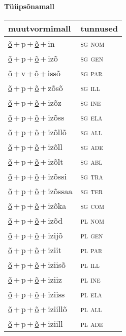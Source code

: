 
\vspace{1.8em}
\begin{minipage}{\textwidth}
\textbf{Tüüpsõnamall \,}\\

\begin{sideways}
\begin{tabular}{l l}
muutvormimall & tunnused \\
\hline
\underline{õ}\,+\,p\,+\,\underline{õ}\,+\,in & \textsc{ sg nom } \\
\underline{õ}\,+\,p\,+\,\underline{õ}\,+\,izõ & \textsc{ sg gen } \\
\underline{õ}\,+\,v\,+\,\underline{õ}\,+\,issõ & \textsc{ sg par } \\
\underline{õ}\,+\,p\,+\,\underline{õ}\,+\,zõsõ & \textsc{ sg ill } \\
\underline{õ}\,+\,p\,+\,\underline{õ}\,+\,izõz & \textsc{ sg ine } \\
\underline{õ}\,+\,p\,+\,\underline{õ}\,+\,izõss & \textsc{ sg ela } \\
\underline{õ}\,+\,p\,+\,\underline{õ}\,+\,izõllõ & \textsc{ sg all } \\
\underline{õ}\,+\,p\,+\,\underline{õ}\,+\,izõll & \textsc{ sg ade } \\
\underline{õ}\,+\,p\,+\,\underline{õ}\,+\,izõlt & \textsc{ sg abl } \\
\underline{õ}\,+\,p\,+\,\underline{õ}\,+\,izõssi & \textsc{ sg tra } \\
\underline{õ}\,+\,p\,+\,\underline{õ}\,+\,izõssaa & \textsc{ sg ter } \\
\underline{õ}\,+\,p\,+\,\underline{õ}\,+\,izõka & \textsc{ sg com } \\
\underline{õ}\,+\,p\,+\,\underline{õ}\,+\,izõd & \textsc{ pl nom } \\
\underline{õ}\,+\,p\,+\,\underline{õ}\,+\,izijõ & \textsc{ pl gen } \\
\underline{õ}\,+\,p\,+\,\underline{õ}\,+\,iziit & \textsc{ pl par } \\
\underline{õ}\,+\,p\,+\,\underline{õ}\,+\,iziisõ & \textsc{ pl ill } \\
\underline{õ}\,+\,p\,+\,\underline{õ}\,+\,iziiz & \textsc{ pl ine } \\
\underline{õ}\,+\,p\,+\,\underline{õ}\,+\,iziiss & \textsc{ pl ela } \\
\underline{õ}\,+\,p\,+\,\underline{õ}\,+\,iziillõ & \textsc{ pl all } \\
\underline{õ}\,+\,p\,+\,\underline{õ}\,+\,iziill & \textsc{ pl ade } \\

\end{tabular}
\end{sideways}
\end{minipage}
